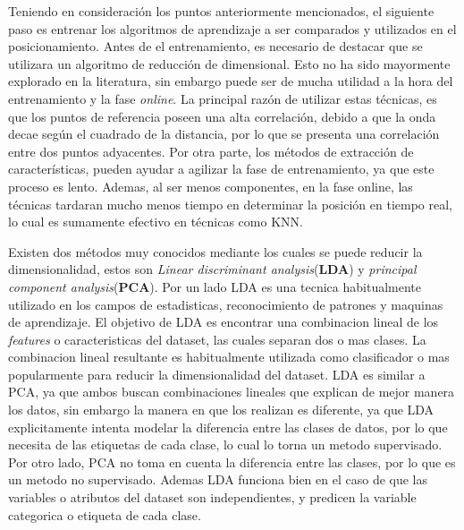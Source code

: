 Teniendo en consideración los puntos anteriormente mencionados, el siguiente paso es entrenar los algoritmos de aprendizaje a ser comparados y utilizados en el posicionamiento. Antes de el entrenamiento, es necesario de destacar que se utilizara un algoritmo de reducción de dimensional. Esto no ha sido mayormente explorado en la literatura, sin embargo puede ser de mucha utilidad a la hora del entrenamiento y la fase \textit{online}. La principal razón de utilizar estas técnicas, es que los puntos de referencia poseen una alta correlación, debido a que la onda decae según el cuadrado de la distancia, por lo que se presenta una correlación entre dos puntos adyacentes. Por otra parte, los métodos de extracción de características, pueden ayudar a agilizar la fase de entrenamiento, ya que este proceso es lento. Ademas, al ser menos componentes, en la fase online, las técnicas tardaran mucho menos tiempo en determinar la posición en tiempo real, lo cual es sumamente efectivo en técnicas como KNN.

Existen dos métodos muy conocidos mediante los cuales se puede reducir la dimensionalidad, estos son \textit{Linear discriminant analysis}(\textbf{LDA}) y \textit{principal component analysis}(\textbf{PCA}). Por un lado LDA es una tecnica habitualmente utilizado en los campos de estadisticas, reconocimiento de patrones y maquinas de aprendizaje. El objetivo de LDA es encontrar una combinacion lineal de los \textit{features} o caracteristicas del dataset, las cuales separan dos o mas clases. La combinacion lineal resultante es habitualmente utilizada como clasificador o mas popularmente para reducir la dimensionalidad del dataset. LDA es similar a PCA, ya que ambos buscan combinaciones lineales que explican de mejor manera los datos, sin embargo la manera en que los realizan es diferente, ya que LDA explicitamente intenta modelar la diferencia entre las clases de datos, por lo que necesita de las etiquetas de cada clase, lo cual lo torna un metodo supervisado. Por otro lado, PCA no toma en cuenta la diferencia entre las clases, por lo que es un metodo no supervisado. Ademas LDA funciona bien en el caso de que las variables o atributos del dataset son independientes, y predicen la variable categorica o etiqueta de cada clase.

